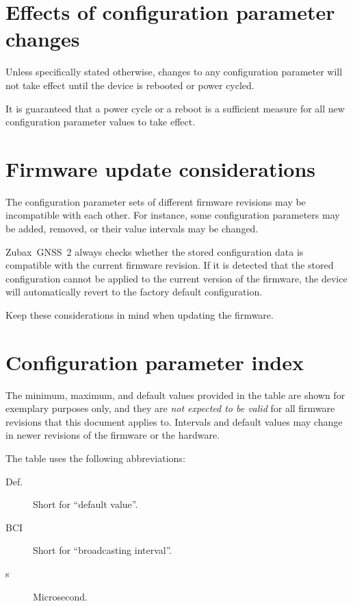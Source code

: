 \documentclass{zubaxdoc}
\begin{document}
\section{Effects of configuration parameter changes}

Unless specifically stated otherwise, changes to any configuration parameter will not take effect until
the device is rebooted or power cycled.

It is guaranteed that a power cycle or a reboot is a sufficient measure for all new configuration parameter
values to take effect.

\section{Firmware update considerations}

The configuration parameter sets of different firmware revisions may be incompatible with each other.
For instance, some configuration parameters may be added, removed, or their value intervals may be changed.

Zubax~GNSS~2 always checks whether the stored configuration data is compatible with the current
firmware revision.
If it is detected that the stored configuration cannot be applied to the current version of the firmware,
the device will automatically revert to the factory default configuration.

Keep these considerations in mind when updating the firmware.

\section{Configuration parameter index}

The minimum, maximum, and default values provided in the table are shown for exemplary purposes only,
and they are \emph{not expected to be valid} for all firmware revisions that this document applies to.
Intervals and default values may change in newer revisions of the firmware or the hardware.

The table uses the following abbreviations:
\begin{description}
\item[Def.] Short for ``default value''.
\item[BCI] Short for ``broadcasting interval''.
\item[{\textmu}s] Microsecond.
\end{description}

\newcommand\CfgParamIndexEntry[6]{%
    \CfgDef{#1} & \footnotesize{#2} & \footnotesize{\CfgListReferences{#1}} &
    \footnotesize{#3} & \footnotesize{#4} & \footnotesize{#5} & \footnotesize{#6}
    \tabularnewline
}%
\end{document}
